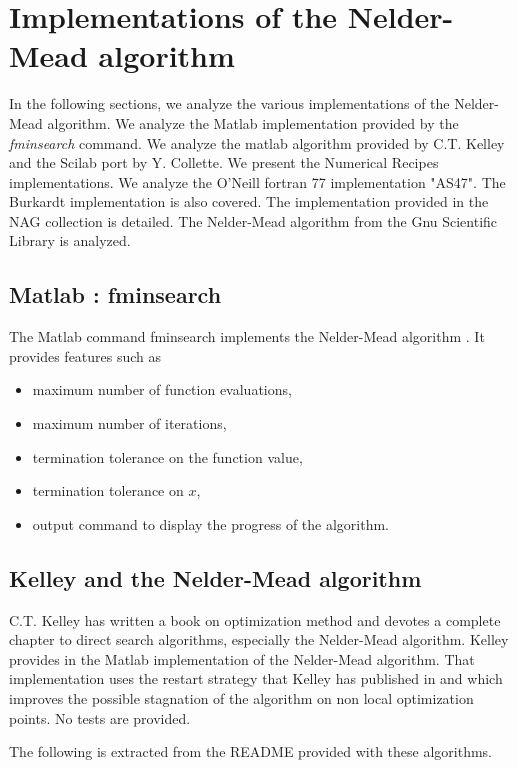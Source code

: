 \chapter{Implementations of the Nelder-Mead algorithm}

In the following sections, we analyze the various implementations of the 
Nelder-Mead algorithm. We analyze the Matlab implementation provided 
by the \emph{fminsearch} command. We analyze the matlab algorithm provided by 
C.T. Kelley and the Scilab port by Y. Collette. We 
present the Numerical Recipes implementations. We analyze the O'Neill 
fortran 77 implementation "AS47". The Burkardt implementation is also covered.
The implementation provided in the NAG collection is detailed.
The Nelder-Mead algorithm from the Gnu Scientific Library is analyzed.

\section{Matlab : fminsearch}

The Matlab command fminsearch implements the Nelder-Mead algorithm \cite{MatlabFminsearch}. 
It provides features such as 
\begin{itemize}
\item maximum number of function evaluations,
\item maximum number of iterations,
\item termination tolerance on the function value,
\item termination tolerance on $x$,
\item output command to display the progress of the algorithm.
\end{itemize}

\section{Kelley and the Nelder-Mead algorithm}

C.T. Kelley has written a book \cite{Kelley1999} on optimization method and devotes a 
complete chapter to direct search algorithms, especially the Nelder-Mead 
algorithm. Kelley provides in \cite{KelleyMethodsOptimizationMatlabCodes} 
the Matlab implementation of the 
Nelder-Mead algorithm. That implementation uses the restart strategy 
that Kelley has published in \cite{589283} and which improves the possible 
stagnation of the algorithm on non local optimization points. No tests 
are provided.

The following is extracted from the README provided with these 
algorithms. 

